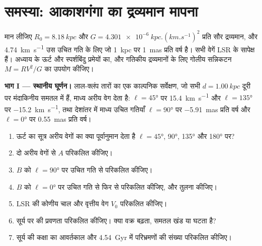 \section{समस्या: आकाशगंगा का द्रव्यमान मापना}

\begin{problem}
\label{pb:b3:milky-way-galaxies:1}
मान लीजिए $R_0 = \qty{8.18}{kpc}$ और $G = \qty{4.301e-6}{kpc.(km.s^{-1})^2}$ प्रति
सौर द्रव्यमान, और \qty{4.74}{km.s^{-1}} उस उचित गति के लिए जो
\qty{1}{kpc} पर \qty{1}{mas} प्रति वर्ष है। सभी वेगें
LSR के सापेक्ष हैं। अध्याय के ऊर्ट और स्पर्शबिंदु प्रमेयों का, और
गतिकीय द्रव्यमानों के लिए गोलीय सन्निकटन $M = RV^2/G$ का उपयोग कीजिए।

\medskip\noindent\textbf{भाग I --- स्थानीय घूर्णन।} लाल-क्लंप तारों का एक काल्पनिक
सर्वेक्षण, जो सभी $d = \qty{1.00}{kpc}$ दूरी पर मंदाकिनीय समतल में हैं,
माध्य अरीय वेग देता है: $\ell = \ang{45}$ पर \qty{+15.4}{km.s^{-1}} और
$\ell = \ang{135}$ पर \qty{-15.2}{km.s^{-1}}, तथा
देशांतर में माध्य उचित गतियाँ $\ell = \ang{90}$ पर \qty{-5.91}{mas} प्रति वर्ष
और $\ell = \ang{0}$ पर \qty{+0.55}{mas} प्रति वर्ष।
\begin{enumerate}
\item ऊर्ट का सूत्र अरीय वेगों का क्या पूर्वानुमान देता है
  $\ell = \ang{45}$, \ang{90}, \ang{135} और \ang{180} पर?
\item दो अरीय वेगों से $A$ परिकलित कीजिए।
\item $B$ को $\ell = \ang{90}$ पर उचित गति से परिकलित कीजिए।
\item $B$ को $\ell = \ang{0}$ पर उचित गति से फिर से परिकलित कीजिए, और
  तुलना कीजिए।
\item LSR की कोणीय चाल और वृत्तीय वेग
  $V_0$ परिकलित कीजिए।
\item सूर्य पर  की प्रवणता परिकलित कीजिए। क्या वक्र
  बढ़ता, समतल खंड या घटता है?
\item सूर्य की कक्षा का आवर्तकाल और
  \qty{4.54}{Gyr} में परिभ्रमणों की संख्या परिकलित कीजिए।
\end{enumerate}


\end{problem}
